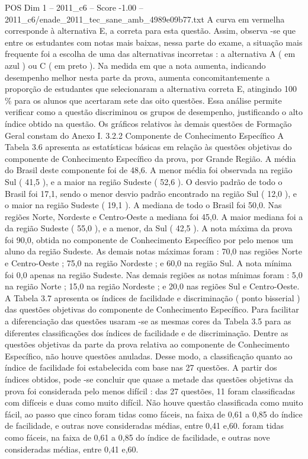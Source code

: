 \begin{textsample}{POS Dim 1 – 2011\_c6 – Score -1.00 – 2011\_c6/enade\_2011\_tec\_sane\_amb\_4989e09b77.txt}
A curva em vermelha corresponde à alternativa E, a correta para esta questão.
Assim, observa -se que entre os estudantes com notas mais baixas, nessa parte do exame, a situação mais frequente foi a escolha de uma das alternativas incorretas : a alternativa A ( em azul ) ou C ( em preto ).
Na medida em que a nota aumenta, indicando desempenho melhor nesta parte da prova, aumenta concomitantemente a proporção de estudantes que selecionaram a alternativa correta E, atingindo 100 \% para os alunos que acertaram sete das oito questões.
Essa análise permite verificar como a questão discriminou os grupos de desempenho, justificando o alto índice obtido na questão.
Os gráficos relativos às demais questões de Formação Geral constam do Anexo I. 3.2.2 Componente de Conhecimento Específico A Tabela 3.6 apresenta as estatísticas básicas em relação às questões objetivas do componente de Conhecimento Específico da prova, por Grande Região.
A média do Brasil deste componente foi de 48,6.
A menor média foi observada na região Sul ( 41,5 ), e a maior na região Sudeste ( 52,6 ).
O desvio padrão de todo o Brasil foi 17,1, sendo o menor desvio padrão encontrado na região Sul ( 12,0 ), e o maior na região Sudeste ( 19,1 ).
A mediana de todo o Brasil foi 50,0.
Nas regiões Norte, Nordeste e Centro-Oeste a mediana foi 45,0.
A maior mediana foi a da região Sudeste ( 55,0 ), e a menor, da Sul ( 42,5 ).
A nota máxima da prova foi 90,0, obtida no componente de Conhecimento Específico por pelo menos um aluno da região Sudeste.
As demais notas máximas foram : 70,0 nas regiões Norte e Centro-Oeste ; 75,0 na região Nordeste ; e 60,0 na região Sul.
A nota mínima foi 0,0 apenas na região Sudeste.
Nas demais regiões as notas mínimas foram : 5,0 na região Norte ; 15,0 na região Nordeste ; e 20,0 nas regiões Sul e Centro-Oeste.
A Tabela 3.7 apresenta os índices de facilidade e discriminação ( ponto bisserial ) das questões objetivas do componente de Conhecimento Específico.
Para facilitar a diferenciação das questões usaram -se as mesmas cores da Tabela 3.5 para as diferentes classificações dos índices de facilidade e de discriminação.
Dentre as questões objetivas da parte da prova relativa ao componente de Conhecimento Específico, não houve questões anuladas.
Desse modo, a classificação quanto ao índice de facilidade foi estabelecida com base nas 27 questões.
A partir dos índices obtidos, pode -se concluir que quase a metade das questões objetivas da prova foi considerada pelo menos difícil : das 27 questões, 11 foram classificadas com difíceis e duas como muito difícil.
Não houve questão classificada como muito fácil, ao passo que cinco foram tidas como fáceis, na faixa de 0,61 a 0,85 do índice de facilidade, e outras nove consideradas médias, entre 0,41 e,60. foram tidas como fáceis, na faixa de 0,61 a 0,85 do índice de facilidade, e outras nove consideradas médias, entre 0,41 e,60.

\end{textsample}
